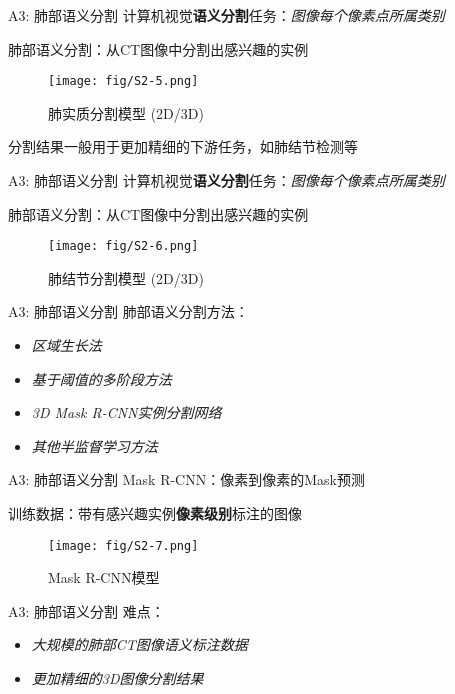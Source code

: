 \documentclass[10pt]{beamer}
\begin{document}
\begin{frame}{A3: 肺部语义分割}
  计算机视觉\textbf{语义分割}任务：\textit{图像每个像素点所属类别}

  肺部语义分割：从CT图像中分割出感兴趣的实例
   
  \begin{figure}[htbp]
    \centering
    \texttt{[image: fig/S2-5.png]}
    \caption{肺实质分割模型 (2D/3D)}
  \end{figure}

  分割结果一般用于更加精细的下游任务，如肺结节检测等

\end{frame}

\begin{frame}{A3: 肺部语义分割}
  计算机视觉\textbf{语义分割}任务：\textit{图像每个像素点所属类别}

  肺部语义分割：从CT图像中分割出感兴趣的实例

  \begin{figure}[htbp]
    \centering
    \texttt{[image: fig/S2-6.png]}
    \caption{肺结节分割模型 (2D/3D)}
  \end{figure}
\end{frame}

\begin{frame}{A3: 肺部语义分割}
  肺部语义分割方法：
  \begin{itemize}
    \item \textit{区域生长法}
    \item \textit{基于阈值的多阶段方法}
    \item \textit{3D Mask R-CNN实例分割网络}
    \item \textit{其他半监督学习方法}
  \end{itemize}
\end{frame}

\begin{frame}{A3: 肺部语义分割}
  Mask R-CNN：像素到像素的Mask预测

  训练数据：带有感兴趣实例\textbf{像素级别}标注的图像
  \begin{figure}[htbp]
    \centering
    \texttt{[image: fig/S2-7.png]}
    \caption{Mask R-CNN模型}
  \end{figure}
\end{frame}

\begin{frame}{A3: 肺部语义分割}
  难点：
  \begin{itemize}
    \item \textit{大规模的肺部CT图像语义标注数据}
    \item \textit{更加精细的3D图像分割结果}
  \end{itemize}
\end{frame}
\end{document}
